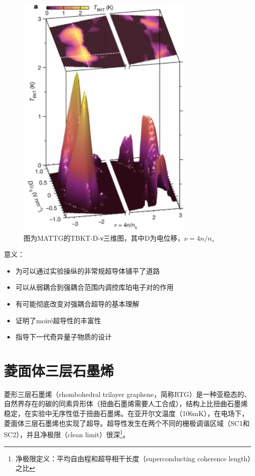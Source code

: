 \begin{figure}
    \centering
    \includegraphics[scale=0.3]{img/三维图.png}
    \caption{图为MATTG的TBKT-D-ν三维图，其中D为电位移，$ν=4n/n_s$}
\end{figure}

意义：

\begin{itemize}
    \item 为可以通过实验操纵的非常规超导体铺平了道路
    \item 可以从弱耦合到强耦合范围内调控库珀电子对的作用
    \item 有可能彻底改变对强耦合超导的基本理解
    \item 证明了moiré超导性的丰富性
    \item 指导下一代奇异量子物质的设计\cite{RN49,RN50,RN51}
\end{itemize}

\section{菱面体三层石墨烯}

菱形三层石墨烯（rhombohedral trilayer graphene，简称RTG）是一种亚稳态的、自然界存在的碳的同素异形体（扭曲石墨烯需要人工合成），结构上比扭曲石墨烯稳定，在实验中无序性低于扭曲石墨烯。在亚开尔文温度（106mK），在电场下，菱面体三层石墨烯也实现了超导。超导性发生在两个不同的栅极调谐区域（SC1和SC2），并且净极限（clean limit）很深\footnote{净极限定义：平均自由程和超导相干长度（superconducting coherence length）之比}。

